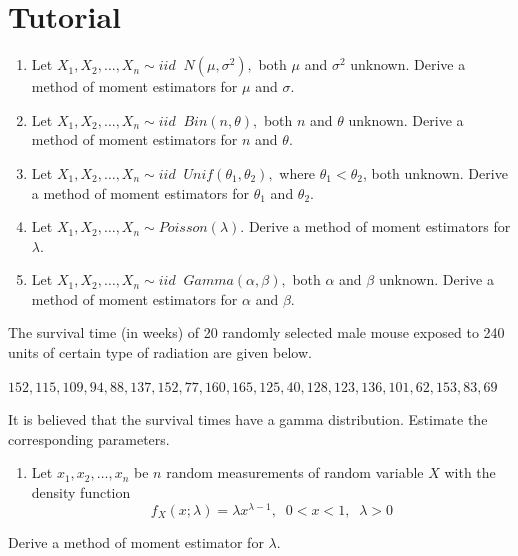 \documentclass[]{book}
\providecommand{\tightlist}{%
  \setlength{\itemsep}{0pt}\setlength{\parskip}{0pt}}
\begin{document}
\newpage
{}

\hypertarget{tutorial-1}{%
\section*{Tutorial}\label{tutorial-1}}

\begin{enumerate}
\def\labelenumi{\arabic{enumi}.}
\item
  Let \(X_1, X_2, \dots, X_n \sim iid\;\; N(\mu, \sigma^2),\) both \(\mu\) and \(\sigma^2\) unknown. Derive a method of moment estimators for \(\mu\) and \(\sigma\).
\item
  Let \(X_1, X_2, \dots, X_n \sim iid\;\; Bin(n,\theta),\) both \(n\) and \(\theta\) unknown. Derive a method of moment estimators for \(n\) and \(\theta\).
\item
  Let \(X_1, X_2, \dots, X_n \sim iid\;\; Unif(\theta_1,\theta_2),\) where \(\theta_1<\theta_2\), both unknown. Derive a method of moment estimators for \(\theta_1\) and \(\theta_2\).
\item
  Let \(X_1, X_2, \dots, X_n \sim Poisson(\lambda).\) Derive a method of moment estimators for \(\lambda\).
\item
  Let \(X_1, X_2, \dots, X_n \sim iid\;\; Gamma(\alpha,\beta),\) both \(\alpha\) and \(\beta\) unknown. Derive a method of moment estimators for \(\alpha\) and \(\beta\).
\end{enumerate}

The survival time (in weeks) of 20 randomly selected male mouse exposed to 240 units of certain type of radiation are given below.

\(152, 115, 109, 94, 88, 137, 152, 77, 160, 165, 125, 40, 128, 123, 136, 101, 62, 153, 83, 69\)

It is believed that the survival times have a gamma distribution. Estimate the corresponding parameters.

\begin{enumerate}
\def\labelenumi{\arabic{enumi}.}
\setcounter{enumi}{5}
\tightlist
\item
  Let \(x_1, x_2, \dots, x_n\) be \(n\) random measurements of random variable \(X\) with the density function
  \[f_X(x;\lambda)= \lambda x^{\lambda-1},\;\; 0<x<1, \;\; \lambda>0\]
\end{enumerate}

Derive a method of moment estimator for \(\lambda\).
\end{document}
